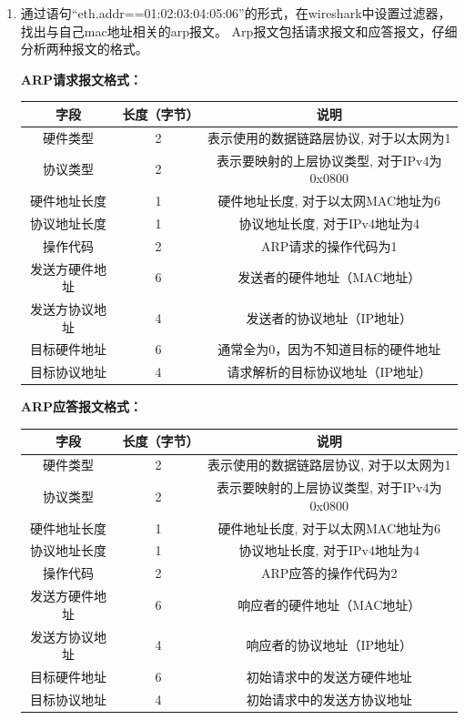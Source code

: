 \documentclass{article}
\begin{document}
\begin{enumerate}[noitemsep]
\item 通过语句“eth.addr==01:02:03:04:05:06”的形式，在wireshark中设置过滤器，找出与自己mac地址相关的arp报文。 Arp报文包括请求报文和应答报文，仔细分析两种报文的格式。

	\textbf{ARP请求报文格式：}
	\begin{center}
		\begin{tabular}{|c|c|c|}
			\hline
			\textbf{字段} & \textbf{长度（字节）} & \textbf{说明} \\
			\hline
			硬件类型 & 2 & 表示使用的数据链路层协议, 对于以太网为1 \\
			\hline
			协议类型 & 2 & 表示要映射的上层协议类型, 对于IPv4为0x0800 \\
			\hline
			硬件地址长度 & 1 & 硬件地址长度, 对于以太网MAC地址为6 \\
			\hline
			协议地址长度 & 1 & 协议地址长度, 对于IPv4地址为4 \\
			\hline
			操作代码 & 2 & ARP请求的操作代码为1 \\
			\hline
			发送方硬件地址 & 6 & 发送者的硬件地址（MAC地址）\\
			\hline
			发送方协议地址 & 4 & 发送者的协议地址（IP地址）\\
			\hline
			目标硬件地址 & 6 & 通常全为0，因为不知道目标的硬件地址 \\
			\hline
			目标协议地址 & 4 & 请求解析的目标协议地址（IP地址）\\
			\hline
		\end{tabular}
	\end{center}
	
	
	\textbf{ARP应答报文格式：}
	\begin{center}
		\begin{tabular}{|c|c|c|}
			\hline
			\textbf{字段} & \textbf{长度（字节）} & \textbf{说明} \\
			\hline
			硬件类型 & 2 & 表示使用的数据链路层协议, 对于以太网为1 \\
			\hline
			协议类型 & 2 & 表示要映射的上层协议类型, 对于IPv4为0x0800 \\
			\hline
			硬件地址长度 & 1 & 硬件地址长度, 对于以太网MAC地址为6 \\
			\hline
			协议地址长度 & 1 & 协议地址长度, 对于IPv4地址为4 \\
			\hline
			操作代码 & 2 & ARP应答的操作代码为2 \\
			\hline
			发送方硬件地址 & 6 & 响应者的硬件地址（MAC地址）\\
			\hline
			发送方协议地址 & 4 & 响应者的协议地址（IP地址）\\
			\hline
			目标硬件地址 & 6 & 初始请求中的发送方硬件地址 \\
			\hline
			目标协议地址 & 4 & 初始请求中的发送方协议地址 \\
			\hline
		\end{tabular}
	\end{center}
	

\end{enumerate}
\end{document}
